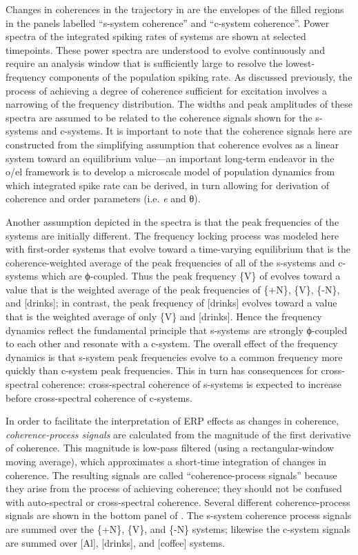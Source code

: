 Changes in coherences in the trajectory in {} are the envelopes of the filled regions in the panels labelled “s-system coherence” and “c-system coherence”. Power spectra of the integrated spiking rates of systems are shown at selected timepoints. These power spectra are understood to evolve continuously and require an analysis window that is sufficiently large to resolve the lowest-frequency components of the population spiking rate. As discussed previously, the process of achieving a degree of coherence sufficient for excitation involves a narrowing of the frequency distribution. The widths and peak amplitudes of these spectra are assumed to be related to the coherence signals shown for the s-systems and c-systems. It is important to note that the coherence signals here are constructed from the simplifying assumption that coherence evolves as a linear system toward an equilibrium value—an important long-term endeavor in the o/el framework is to develop a microscale model of population dynamics from which integrated spike rate can be derived, in turn allowing for derivation of coherence and order parameters (i.e. \textit{e} and θ). 

Another assumption depicted in the spectra is that the peak frequencies of the systems are initially different. The frequency locking process was modeled here with first-order systems that evolve toward a time-varying equilibrium that is the coherence-weighted average of the peak frequencies of all of the s-systems and c-systems which are ϕ-coupled. Thus the peak frequency \{V\} of evolves toward a value that is the weighted average of the peak frequencies of \{+N\}, \{V\}, \{-N\}, and [drinks]; in contrast, the peak frequency of [drinks] evolves toward a value that is the weighted average of only \{V\} and [drinks]. Hence the frequency dynamics reflect the fundamental principle that s-systems are strongly ϕ-coupled to each other and resonate with a c-system. The overall effect of the frequency dynamics is that s-system peak frequencies evolve to a common frequency more quickly than c-system peak frequencies. This in turn has consequences for cross-spectral coherence: cross-spectral coherence of s-systems is expected to increase before cross-spectral coherence of c-systems.

  In order to facilitate the interpretation of ERP effects as changes in coherence, \textit{coherence-process signals} are calculated from the magnitude of the first derivative of coherence. This magnitude is low-pass filtered (using a rectangular-window moving average), which approximates a short-time integration of changes in coherence. The resulting signals are called “coherence-process signals” because they arise from the process of achieving coherence; they should not be confused with auto-spectral or cross-spectral coherence. Several different coherence-process signals are shown in the bottom panel of {}. The s-system coherence process signals are summed over the \{+N\}, \{V\}, and \{-N\} systems; likewise the c-system signals are summed over [Al], [drinks], and [coffee] systems. 
  
